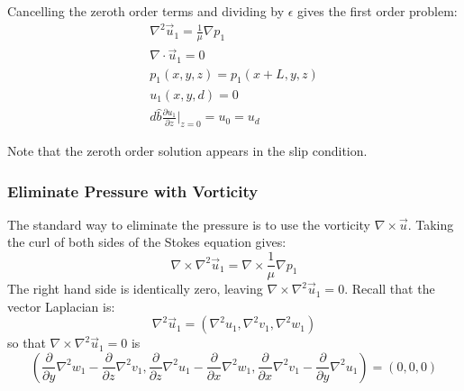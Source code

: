 \documentclass[a4paper]{report}
\begin{document}
Cancelling the zeroth order terms and dividing by $\epsilon$ gives the first order problem:
\begin{gather}
\nabla^2 \vec{u}_1 = \frac{1}{\mu} \nabla p_1 \\
\nabla \cdot \vec{u}_1 = 0  \\
p_1(x,y,z) = p_1(x+L,y,z) \\
u_1(x,y,d) = 0 \\ 
d \hat{b} \frac{\partial u_1}{\partial z} \rvert_{z=0} = u_0 =  u_d
\end{gather}

Note that the zeroth order solution appears in the slip condition.

\subsubsection*{Eliminate Pressure with Vorticity}

The standard way to eliminate the pressure is to use the vorticity $\nabla \times \vec{u}$.
Taking the curl of both sides of the Stokes equation gives:
\begin{equation}
\nabla \times \nabla^2 \vec{u}_1  = \nabla \times \frac{1}{\mu} \nabla p_1 
\end{equation}
The right hand side is identically zero, leaving $ \nabla \times \nabla^2 \vec{u}_1 = 0 $.
Recall that the vector Laplacian is:
\begin{equation}
\nabla^2 \vec{u}_1 = \left( \nabla^2 u_1, \nabla^2 v_1, \nabla^2 w_1 \right)
\end{equation}
so that $  \nabla \times \nabla^2 \vec{u}_1 = 0 $ is
\begin{equation}
\left( 
\frac{\partial}{\partial y} \nabla^2 w_1 - \frac{\partial}{\partial z} \nabla^2 v_1,
\frac{\partial}{\partial z} \nabla^2 u_1 - \frac{\partial}{\partial x} \nabla^2 w_1,
\frac{\partial}{\partial x} \nabla^2 v_1 - \frac{\partial}{\partial y} \nabla^2 u_1
\right) = (0,0,0)
\end{equation}
\end{document}
